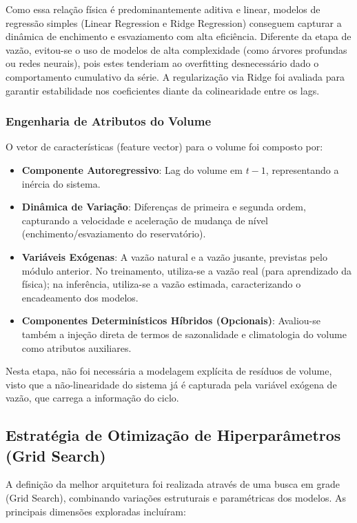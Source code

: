 Como essa relação física é predominantemente aditiva e linear, modelos de regressão simples (Linear Regression e Ridge Regression) conseguem capturar a dinâmica de enchimento e esvaziamento com alta eficiência. Diferente da etapa de vazão, evitou-se o uso de modelos de alta complexidade (como árvores profundas ou redes neurais), pois estes tenderiam ao overfitting desnecessário dado o comportamento cumulativo da série. A regularização via Ridge foi avaliada para garantir estabilidade nos coeficientes diante da colinearidade entre os lags.

\subsubsection{Engenharia de Atributos do Volume}

O vetor de características (feature vector) para o volume foi composto por:

\begin{itemize}
\item \textbf{Componente Autoregressivo}: Lag do volume em $t-1$, representando a inércia do sistema.
\item \textbf{Dinâmica de Variação}: Diferenças de primeira e segunda ordem, capturando a velocidade e aceleração de mudança de nível (enchimento/esvaziamento do reservatório).
\item \textbf{Variáveis Exógenas}: A vazão natural e a vazão jusante, previstas pelo módulo anterior. No treinamento, utiliza-se a vazão real (para aprendizado da física); na inferência, utiliza-se a vazão estimada, caracterizando o encadeamento dos modelos.
\item \textbf{Componentes Determinísticos Híbridos (Opcionais)}: Avaliou-se também a injeção direta de termos de sazonalidade e climatologia do volume como atributos auxiliares.
\end{itemize}

Nesta etapa, não foi necessária a modelagem explícita de resíduos de volume, visto que a não-linearidade do sistema já é capturada pela variável exógena de vazão, que carrega a informação do ciclo.

\subsection{Estratégia de Otimização de Hiperparâmetros (Grid Search)}

A definição da melhor arquitetura foi realizada através de uma busca em grade (Grid Search), combinando variações estruturais e paramétricas dos modelos. As principais dimensões exploradas incluíram:

